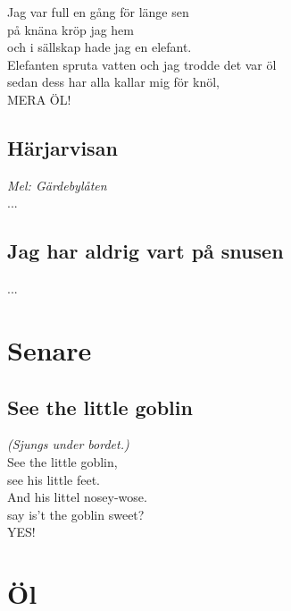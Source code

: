 \documentclass[twoside, openright]{report}
\begin{document}
Jag var full en gång för länge sen\\
på knäna kröp jag hem\\
och i sällskap hade jag en elefant.\\
Elefanten spruta vatten och jag trodde det var öl\\
sedan dess har alla kallar mig för knöl,\\
MERA ÖL!\\

\section{Härjarvisan}
\textit{Mel: Gärdebylåten}\\

...

\section{Jag har aldrig vart på snusen}

...

\chapter{Senare}

\section{See the little goblin}
\textit{(Sjungs under bordet.)}\\

See the little goblin,\\
see his little feet.\\
And his littel nosey-wose.\\
say is't the goblin sweet?\\
YES!

\chapter{Öl}
\end{document}
